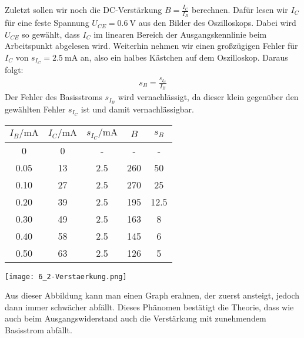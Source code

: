 Zuletzt sollen wir noch die DC-Verst\"arkung $B=\frac{I_C}{I_B}$ berechnen. Dafür lesen wir $I_C$ für eine feste Spannung $U_{CE}=0.6~\text{V}$ aus den Bilder des Oszilloskops. Dabei wird $U_{CE}$ so gewählt, dass $I_C$ im linearen Bereich der Ausgangskennlinie beim Arbeitspunkt abgelesen wird. Weiterhin nehmen wir einen großzügigen Fehler für $I_C$ von $s_{I_C}=2.5~\text{mA}$ an, also ein halbes Kästchen auf dem Oszilloskop.  Daraus folgt:
\begin{align}
    s_B=\frac{s_{I_C}}{I_B}
\end{align}
Der Fehler des Basisstroms $s_{I_B}$ wird vernachlässigt, da dieser klein gegenüber den gewählten Fehler $s_{I_C}$ ist und damit vernachlässigbar.
\begin{center}
    \begin{tabular}{ccc|cc}
        $I_B/\text{mA}$ & $I_C/\text{mA}$ & $s_{I_C}/\text{mA}$ & $B$ & $s_B$ \\
        \hline
        0     & 0     & -   & -   & - \\
        0.05  & 13    & 2.5   & 260   & 50 \\
        0.10   & 27    & 2.5   & 270   & 25 \\
        0.20   & 39    & 2.5   & 195   & 12.5 \\
        0.30   & 49    & 2.5   & 163   & 8 \\
        0.40   & 58    & 2.5   & 145   & 6 \\
        0.50   & 63    & 2.5   & 126   & 5 \\
        \end{tabular}
\end{center}
\begin{center}
    \texttt{[image: 6\_2-Verstaerkung.png]}
\end{center}
Aus dieser Abbildung kann man einen Graph erahnen, der zuerst ansteigt, jedoch dann immer schw\"acher abf\"allt. Dieses Ph\"anomen best\"atigt die Theorie, dass wie auch beim Ausgangswiderstand auch die Verst\"arkung mit zunehmendem Basisstrom abf\"allt. \\